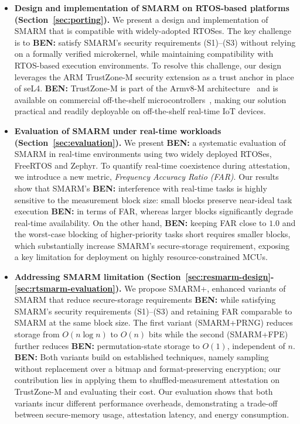 \documentclass{ieeeaccess}
\DeclareRobustCommand{\ben}[1]{{\color{BENcolor}\textbf{BEN:} #1}}
\newcommand{\rtsmarmone}{SMARM+PRNG\xspace}
\newcommand{\rtsmarmtwo}{SMARM+FPE\xspace}
\newcommand{\acron}{SMARM+\xspace}
\begin{document}
\begin{itemize}\sloppy
    \item \textbf{Design and implementation of SMARM on RTOS-based platforms (Section~\ref{sec:porting}).}
    We present a design and implementation of SMARM that is compatible with widely-adopted RTOSes.
    The key challenge is to \ben{satisfy SMARM's security requirements (S1)--(S3)} without relying on a formally verified microkernel, while maintaining compatibility with RTOS-based execution environments.
    To resolve this challenge, our design leverages the ARM TrustZone-M security extension as a trust anchor in place of seL4.
    \ben{TrustZone-M is part of the Armv8-M architecture~\cite{armv8m-arm} and is available on commercial off-the-shelf microcontrollers~\cite{tzm-sec-iot,stm32l552_nucleo144}}, making our solution practical and readily deployable on off-the-shelf real-time IoT devices.
    
    \item \textbf{Evaluation of SMARM under real-time workloads (Section~\ref{sec:evaluation}).}
    We present \ben{a systematic evaluation} of SMARM in real-time environments using two widely deployed RTOSes, FreeRTOS and Zephyr.
    To quantify real-time coexistence during attestation, we introduce a new metric, \emph{Frequency Accuracy Ratio (FAR)}.
    Our results show that SMARM's \ben{interference with real-time tasks} is highly sensitive to the measurement block size: small blocks preserve near-ideal task execution \ben{in terms of FAR}, whereas larger blocks significantly degrade real-time availability.
    On the other hand, \ben{keeping FAR close to $1.0$ and the worst-case blocking of higher-priority tasks short} requires smaller blocks, which substantially increase SMARM's secure-storage requirement, exposing a key limitation for deployment on highly resource-constrained MCUs.
 
    \item \textbf{Addressing SMARM limitation (Section~\ref{sec:resmarm-design}-\ref{sec:rtsmarm-evaluation}).}
    We propose \acron, enhanced variants of SMARM that reduce secure-storage requirements \ben{while satisfying SMARM's security requirements (S1)--(S3) and retaining FAR comparable to SMARM at the same block size}.
    The first variant (\rtsmarmone) reduces storage from $O(n \log n)$ to $O(n)$ bits while the second (\rtsmarmtwo) further reduces \ben{permutation-state storage to $O(1)$, independent of $n$}.
    \ben{Both variants build on established techniques, namely sampling without replacement over a bitmap and format-preserving encryption; our contribution lies in applying them to shuffled-measurement attestation on TrustZone-M and evaluating their cost.}
    Our evaluation shows that both variants incur different performance overheads, demonstrating a trade-off between secure-memory usage, attestation latency, and energy consumption. 

\end{itemize}
\end{document}
